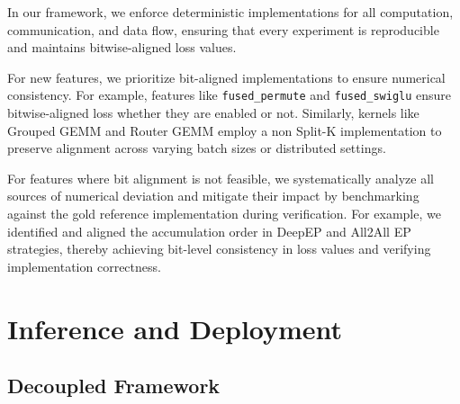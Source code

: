 \documentclass{article}
\begin{document}
In our framework, we enforce deterministic implementations for all computation, communication, and data flow, ensuring that every experiment is reproducible and maintains bitwise-aligned loss values.

For new features, we prioritize bit-aligned implementations to ensure numerical consistency. For example, features like \verb|fused_permute| and \verb|fused_swiglu| ensure bitwise-aligned loss whether they are enabled or not. 
Similarly, kernels like Grouped GEMM and Router GEMM employ a non Split-K implementation to preserve alignment across varying batch sizes or distributed settings.

For features where bit alignment is not feasible, we systematically analyze all sources of numerical deviation and mitigate their impact by benchmarking against the gold reference implementation during verification. For example, we identified and aligned the accumulation order in DeepEP and All2All EP strategies, thereby achieving bit-level consistency in loss values and verifying implementation correctness.


\section{Inference and Deployment} %
\label{sec7:infer}

\subsection{Decoupled Framework}



\end{document}
